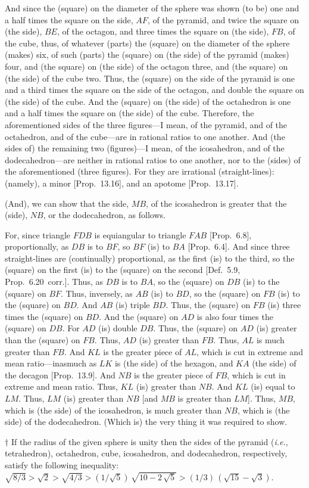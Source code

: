 \begin{Parallel}{}{}
{And since the (square) on the diameter of the sphere was shown (to be)
one and a half times the square on the side, $AF$,  of the pyramid,
and twice the square on (the side), $BE$,  of the octagon, and
three times the square on (the side), $FB$, of the cube, 
thus, of whatever (parts) the (square) on the diameter of the
sphere (makes) six, of such (parts) the (square) on (the side) of the pyramid (makes)
four, and (the square) on (the side) of the octagon three, and (the
square) on (the side) of the cube  two. Thus, the (square) on the
side of the pyramid is one and a third times the square on the side of the
octagon, and double the square on (the side) of the cube. 
And the (square) on (the side) of the octahedron is one and a half
times the square on (the side) of the cube. Therefore, the aforementioned
sides of the three figures---I mean, of the pyramid, and of the octahedron, and 
of the cube---are
in rational ratios to one another. And (the sides of) the remaining two (figures)---I mean, of
the icosahedron, and of the dodecahedron---are neither in rational ratios to
one another, nor to the (sides) of the aforementioned (three figures). For they are
irrational (straight-lines): (namely), a minor [Prop.~13.16], and 
an apotome [Prop.~13.17].

(And), we can show that the side, $MB$, of the icosahedron is greater
that the (side), $NB$, or the dodecahedron, as follows.

For, since triangle $FDB$ is equiangular to triangle $FAB$ [Prop.~6.8],
proportionally, as $DB$ is to $BF$, so $BF$ (is) to $BA$ [Prop.~6.4]. 
And since three straight-lines are (continually) proportional, as the
first (is) to the third, so the (square) on the first (is) to the (square) on the
second [Def.~5.9, Prop.~6.20~corr.]. Thus, as $DB$ is to $BA$, so the (square) on $DB$
(is) to the (square) on $BF$. Thus, inversely, as $AB$ (is) to $BD$, so the
(square) on $FB$ (is) to the (square) on $BD$. And $AB$ (is) triple
$BD$. Thus, the (square) on $FB$ (is) three times the (square)
on $BD$. And the (square) on $AD$ is also four times the (square)
on $DB$. For $AD$ (is) double $DB$. Thus, the (square) on $AD$
(is) greater than the (square) on $FB$.  Thus, $AD$ (is) greater than
$FB$. 
Thus, $AL$ is much greater than $FB$. And $KL$ is the greater piece of $AL$, which is cut in extreme and
mean ratio---inasmuch as $LK$ is (the side) of the hexagon, and $KA$
(the side) of the decagon [Prop.~13.9]. And $NB$
is the greater piece of $FB$, which is cut in extreme and mean ratio. 
Thus, $KL$ (is) greater than $NB$.  And $KL$ (is) equal to $LM$. 
Thus, $LM$ (is) greater than $NB$ [and $MB$ is greater than $LM$].
Thus, $MB$, which is (the side) of the icosahedron, is much greater
than $NB$, which is (the side) of the dodecahedron.  (Which is)
the very thing it was required to show.}
\end{Parallel}
{\footnotesize\noindent$\dag$ If the radius of the given sphere is unity 
then the sides of the pyramid ({\em i.e.}, tetrahedron), octahedron, cube,
icosahedron, and dodecahedron, respectively, satisfy the following
inequality: $\sqrt{8/3} > \sqrt{2}>\sqrt{4/3}>(1/\sqrt{5})\,\sqrt{10 -2\,\sqrt{5}}
> (1/3)\,(\sqrt{15}-\sqrt{3})$.}

